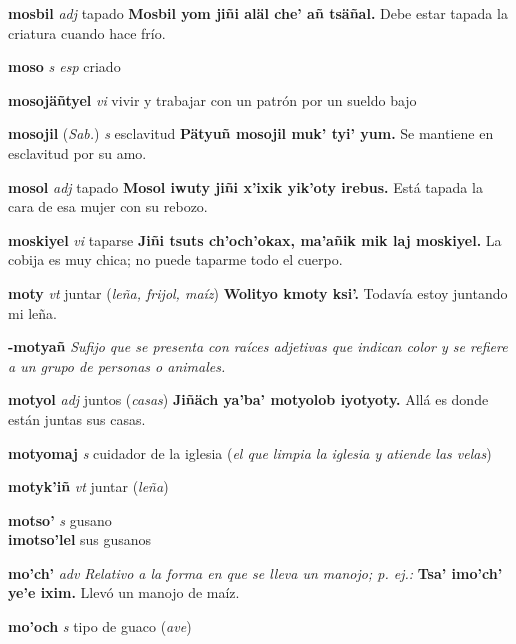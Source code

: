 \documentclass[10pt]{scrbook}
\newcommand{\entry}[1]{\textbf{#1}}
\newcommand{\nontranslationdef}[1]{\textit{#1}}
\newcommand{\partofspeech}[1]{\textit{#1}}
\newcommand{\spanishtranslation}[1]{#1}
\newcommand{\clarification}[1]{(\textit{#1})}
\newcommand{\cholexample}[1]{\textbf{#1}}
\newcommand{\exampletranslation}[1]{#1}
\newcommand{\relevantdialect}[1]{(\textit{#1})}
\newcommand{\secondaryentry}[1]{\\\textbf{#1}}
\newcommand{\secondtranslation}[1]{#1}
\begin{document}
\begin{multicols}{2}
\entry{mosbil}
\partofspeech{adj}
\spanishtranslation{tapado}
\cholexample{Mosbil yom jiñi aläl che' añ tsäñal.}
\exampletranslation{Debe estar tapada la criatura cuando hace frío.}

\entry{moso}
\partofspeech{s esp}
\spanishtranslation{criado}

\entry{mosojäñtyel}
\partofspeech{vi}
\spanishtranslation{vivir y trabajar con un patrón por un sueldo bajo}

\entry{mosojil}
\relevantdialect{Sab.}
\partofspeech{s}
\spanishtranslation{esclavitud}
\cholexample{Pätyuñ mosojil muk' tyi' yum.}
\exampletranslation{Se mantiene en esclavitud por su amo.}

\entry{mosol}
\partofspeech{adj}
\spanishtranslation{tapado}
\cholexample{Mosol iwuty jiñi x'ixik yik'oty irebus.}
\exampletranslation{Está tapada la cara de esa mujer con su rebozo.}

\entry{moskiyel}
\partofspeech{vi}
\spanishtranslation{taparse}
\cholexample{Jiñi tsuts ch'och'okax, ma'añik mik laj moskiyel.}
\exampletranslation{La cobija es muy chica; no puede taparme todo el cuerpo.}

\entry{moty}
\partofspeech{vt}
\spanishtranslation{juntar}
\clarification{leña, frijol, maíz}
\cholexample{Wolityo kmoty ksi'.}
\exampletranslation{Todavía estoy juntando mi leña.}

\entry{-motyañ}
\nontranslationdef{Sufijo que se presenta con raíces adjetivas que indican color y se refiere a un grupo de personas o animales.}

\entry{motyol}
\partofspeech{adj}
\spanishtranslation{juntos}
\clarification{casas}
\cholexample{Jiñäch ya'ba' motyolob iyotyoty.}
\exampletranslation{Allá es donde están juntas sus casas.}

\entry{motyomaj}
\partofspeech{s}
\spanishtranslation{cuidador de la iglesia}
\clarification{el que limpia la iglesia y atiende las velas}

\entry{motyk'iñ}
\partofspeech{vt}
\spanishtranslation{juntar}
\clarification{leña}

\entry{motso'}
\partofspeech{s}
\spanishtranslation{gusano}
\secondaryentry{imotso'lel}
\secondtranslation{sus gusanos}

\entry{mo'ch'}
\partofspeech{adv}
\nontranslationdef{Relativo a la forma en que se lleva un manojo; p. ej.:}
\cholexample{Tsa' imo'ch' ye'e ixim.}
\exampletranslation{Llevó un manojo de maíz.}

\entry{mo'och}
\partofspeech{s}
\spanishtranslation{tipo de guaco}
\clarification{ave}


\end{multicols}
\end{document}
